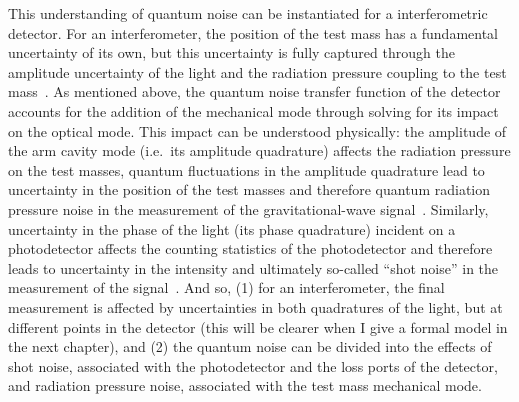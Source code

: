 This understanding of quantum noise can be instantiated for a interferometric detector. 
For an interferometer, the position of the test mass has a fundamental uncertainty of its own, but this uncertainty is fully captured through the amplitude uncertainty of the light and the radiation pressure coupling to the test mass~\cite{}. As mentioned above, the quantum noise transfer function of the detector accounts for the addition of the mechanical mode through solving for its impact on the optical mode. 
This impact can be understood physically: the amplitude of the arm cavity mode (i.e.\ its amplitude quadrature) affects the radiation pressure on the test masses, quantum fluctuations in the amplitude quadrature lead to uncertainty in the position of the test masses and therefore quantum radiation pressure noise in the measurement of the gravitational-wave signal~\cite{Danilishin?}. Similarly, uncertainty in the phase of the light (its phase quadrature) incident on a photodetector affects the counting statistics of the photodetector and therefore leads to uncertainty in the intensity and ultimately so-called ``shot noise'' in the measurement of the signal~\cite{}.   %
And so, (1) for an interferometer, the final measurement is affected by uncertainties in both quadratures of the light, but at different points in the detector (this will be clearer when I give a formal model in the next chapter), and (2) the quantum noise can be divided into the effects of shot noise, associated with the photodetector and the loss ports of the detector, and radiation pressure noise, associated with the test mass mechanical mode. 





